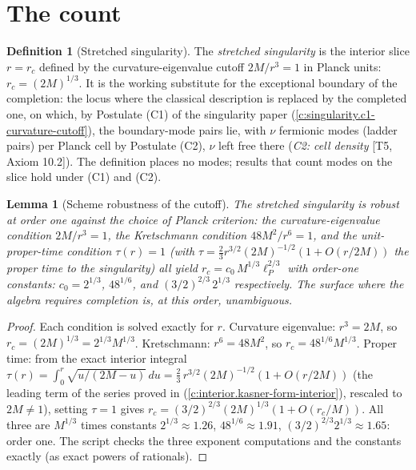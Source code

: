 \documentclass[11pt]{article}
\newtheorem{lemma}[theorem]{Lemma}
\theoremstyle{definition}
\newtheorem{definition}[theorem]{Definition}
\theoremstyle{plain}
\newcommand{\changedmark}[2]{\marginpar{\raggedright\scriptsize\color{#1}#2}}
\providecommand{\lP}{}\renewcommand{\lP}{\ell_{P}}
\begin{document}
\section{The count}

\begin{definition}[Stretched singularity]\label{c:obj.scrambling.stretched-singularity}
\changedmark{BrickRed}{corrected since the deposit}
The \emph{stretched singularity} is the interior slice $r = r_c$ defined by the curvature-eigenvalue cutoff $2M/r^3 = 1$ in Planck units: $r_c = (2M)^{1/3}$. It is the working substitute for the exceptional boundary of the completion: the locus where the classical description is replaced by the completed one, on which, by Postulate (C1) of the singularity paper (\ref{c:singularity.c1-curvature-cutoff}), the boundary-mode pairs lie, with $\nu$ fermionic modes (ladder pairs) per Planck cell by Postulate (C2), $\nu$ left free there (\emph{C2: cell density} [T5, Axiom 10.2]). The definition places no modes; results that count modes on the slice hold under (C1) and (C2).
\end{definition}

\begin{lemma}[Scheme robustness of the cutoff]\label{c:scrambling.scheme-robustness-cutoff}
The stretched singularity is robust at order one against the choice of Planck criterion: the curvature-eigenvalue condition $2M/r^3 = 1$, the Kretschmann condition $48M^2/r^6 = 1$, and the unit-proper-time condition $\tau(r) = 1$ (with $\tau = \tfrac23 r^{3/2}(2M)^{-1/2}(1 + O(r/2M))$ the proper time to the singularity) all yield $r_c = c_0\,M^{1/3}\lP^{2/3}$ with order-one constants: $c_0 = 2^{1/3}$, $48^{1/6}$, and $(3/2)^{2/3}\,2^{1/3}$ respectively. The surface where the algebra requires completion is, at this order, unambiguous.
\end{lemma}
\begin{proof}
Each condition is solved exactly for $r$. Curvature eigenvalue: $r^3 = 2M$, so $r_c = (2M)^{1/3} = 2^{1/3}M^{1/3}$. Kretschmann: $r^6 = 48M^2$, so $r_c = 48^{1/6}M^{1/3}$. Proper time: from the exact interior integral $\tau(r) = \int_0^r \sqrt{u/(2M - u)}\,du = \tfrac{2}{3}\,r^{3/2}(2M)^{-1/2}(1 + O(r/2M))$ (the leading term of the series proved in \cite[Lem.~5.1]{ButlerT6} (\ref{c:interior.kasner-form-interior}), rescaled to $2M \neq 1$), setting $\tau = 1$ gives $r_c = (3/2)^{2/3}(2M)^{1/3}(1 + O(r_c/M))$. All three are $M^{1/3}$ times constants $2^{1/3} \approx 1.26$, $48^{1/6} \approx 1.91$, $(3/2)^{2/3}2^{1/3} \approx 1.65$: order one. The script checks the three exponent computations and the constants exactly (as exact powers of rationals).

\end{proof}
\end{document}
